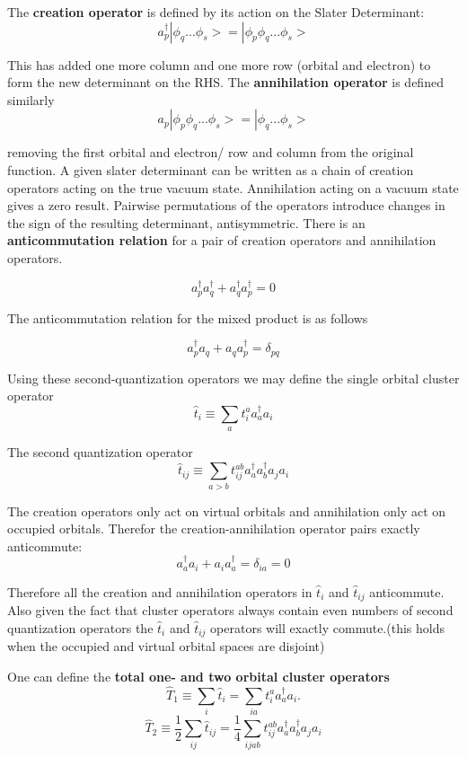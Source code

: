 \documentclass[10pt, draft]{article}
\begin{document}
The \textbf{creation operator} is defined by its action on the Slater Determinant:
\[a_p^{\dagger}|\phi_q...\phi_s > = |\phi_p \phi_q...\phi_s>\]

This has added one more column and one more row (orbital and electron) to form the new determinant on the RHS.  The \textbf{annihilation operator} is defined similarly 
\[a_p|\phi_p\phi_q...\phi_s> = |\phi_q ... \phi_s> \]

removing the first orbital and electron/ row and column from the original function.  A given slater determinant can be written as a chain of creation operators acting on the true vacuum state.  Annihilation acting on a vacuum state gives a zero result. Pairwise permutations of the operators introduce changes in the sign of the resulting determinant, antisymmetric. There is an \textbf{anticommutation relation} for a pair of creation operators and annihilation operators.

\[a_p^{\dagger}a_q^\dagger + a_q^\dagger a_p^\dagger = 0\]

The anticommutation relation for the mixed product is as follows

\[a_p^\dagger a_q + a_q a_p^\dagger = \delta_{pq}\]

Using these second-quantization operators we may define the single orbital cluster operator
\[\hat{t}_i \equiv \sum_a t_i^a a_a^\dagger a_i\]

The second quantization operator 
\[\hat{t}_{ij} \equiv \sum_{a>b} t_{ij}^{ab} a_a^\dagger a_b^\dagger a_j a_i\]

The creation operators only act on virtual orbitals and annihilation only act on occupied orbitals.  Therefor the creation-annihilation operator pairs exactly anticommute:
\[a_a^\dagger a_i + a_i a_a^\dagger = \delta_{ia} = 0\]

Therefore all the creation and annihilation operators in $\hat{t}_i$ and $\hat{t}_{ij}$ anticommute.  Also given the fact that cluster operators always contain even numbers of second quantization operators the $\hat{t}_i$ and $\hat{t}_{ij}$ operators will exactly commute.(this holds when the occupied and virtual orbital spaces are disjoint)\linebreak[1]

One can define the \textbf{total one- and two orbital cluster operators}
\[\hat{T}_1 \equiv \sum_i \hat{t}_i = \sum_{ia}t_i^a a_a^\dagger a_i.\]
\[\hat{T}_2 \equiv \frac{1}{2}\sum_{ij} \hat{t}_{ij} = \frac{1}{4} \sum_{ijab} t_{ij}^{ab} a_a^\dagger a_b^\dagger a_j a_i \]
\end{document}
